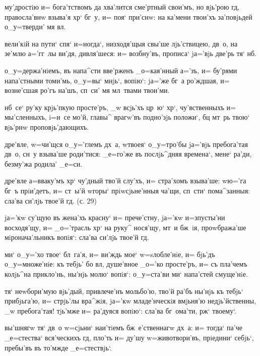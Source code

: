 
 му'дростiю и= бога'тствомъ да хва'лится 
сме'ртный свои'мъ, но вjь'рою гд, правосла'внw 
взыва'я хр` бг~у, и= поя` при'снw: на ка'мени твои'хъ 
за'повjьдей о_у=тверди' мя вл.

 вели'кiй на пути` спя` и=ногда`, низходя'щыя 
свы'ше лjь'ствицею, дв~о, на зе'млю а='гг~лы ви'дя, 
дивля'шеся: и= возбну'въ, прописа` jа='вjь две'рь тя` 
нб.

 о_у=держа'нiемъ, въ напа^сти вве'рженъ 
_о=кая'нный а='зъ, и= бу'рями напа'стными томи'мь, 
о_у=вы` мнjь`, вопiю`: jа='же бг~а ро'ждшая, и= 
возне'сшая ро'гъ на'шъ, сп~си' мя мл~твами твои'ми.

  нб~се` ру'ку крjь'пкую просте'ръ, _w 
всjь'хъ цр~ю` хр`, чу'вственныхъ и= мы'сленныхъ, 
i=и~се мо'й, главы^ врагw'въ под\ъ но'зjь положи`, бц 
мт~рь твою` вjь'рнw проповjь'дающихъ.

   дре'вле, w=чи'щся о_у='глемъ дх~а, 
w\т твоея` о_у=тро'бы jа='вjь пребога'тая дв~о, сн~у 
взыва'ше роди'тися: _е=го'же въ послjь^дняя времена`, 
мене` ра'ди, без\ъ му'жа родила' _е=си.


 дре'вле а=вваку'мъ хр` чу'дный 
тво'й слу'хъ, и= стра'хомъ взыва'ше: w\т ю='га бг~ъ 
прiи'детъ, и= ст~ы'й w\т горы` прiwсjьне'нныя ча'щи, 
сп~сти` пома^занныя: сла'ва си'лjь твое'й гд. (с. 29)

 jа='кw су'щую въ жена'хъ красну` и= прече'стну, 
jа='кw и=з\ъ пусты'ни восходя'щу, и= _о='трасль хр` 
на руку^ нося'щу, мт~и бж~iя, проwбража'ше 
мiронача'льникъ вопiя`: сла'ва си'лjь твое'й гд.

 ми` о_у='хо твое` бл~га'я, и= ви'ждь мое` 
w=sлобле'нiе, и= бjь'дъ о_у=множе'нiе: къ тебjь' бо 
вл, душе'вное _о='ко просте'ръ, и= съ пла'чемъ 
колjь^на прикло'нь, ны'нjь молю` вопiя`: о_у=ста'ви ми` 
напа'стей смуще'нiе.

  тя` неwбори'мую вjь'дый, привлече'нъ 
мольбо'ю, тво'й ра'бъ ны'нjь къ тебjь` прибjьга'ю, и= 
стрjь'лы вра^жiя, jа='кw младе'нческiя вмjьня'ю 
недjь'йственны, _w пребога'тая! тjь'мже и= ра'дуяся 
вопiю`: сла'ва бг~ома'ти, рж` твоему`.

   вы'шнягw тя` дв~о w=сjьни` наи'тiемъ 
бж~е'ственнагw дх~а: и= тогда` па'че _е=стества` 
вся'ческихъ гд, пло'ть и= ду'шу w=животвори'въ, 
прiедини` себjь`, пребы'въ въ то'мжде _е=стествjь`.

